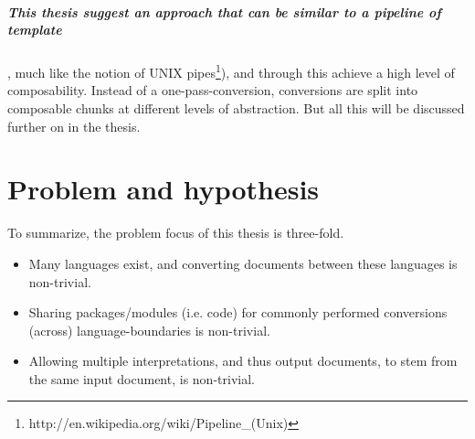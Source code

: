 \documentclass{scrreprt}
\begin{document}

\paragraph{This thesis suggest an approach that can be similar to a pipeline of template}, much like the notion of UNIX pipes\footnote{http://en.wikipedia.org/wiki/Pipeline\_(Unix)}), and through this achieve a high level of composability. Instead of a one-pass-conversion, conversions are split into composable chunks at different levels of abstraction. But all this will be discussed further on in the thesis.

\color{black}
























\chapter{Problem and hypothesis}
To summarize, the problem focus of this thesis is three-fold.

\begin{itemize}
\item Many languages exist, and converting documents between these languages is non-trivial.
\item Sharing packages/modules (i.e. code) for commonly performed conversions (across) language-boundaries is non-trivial.
\item Allowing multiple interpretations, and thus output documents, to stem from the same input document, is non-trivial.
\end{itemize}
\end{document}
